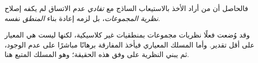 \documentclass[../../../include/open-logic-section]{subfiles}
\begin{document}
  فالحاصل أن من أراد الأخذ بالاستيعاب الساذج مع \emph{تفادي} عدم الاتساق
لم يكفه إصلاح \emph{نظرية المجموعات}، بل لزمه إعادة بناء
\emph{المنطق} نفسه.

وقد وُضعت فعلًا نظريات مجموعات بمنطقيات غير كلاسيكية، لكنها ليست هي
المعيار على أقل تقدير. وأما المسلك المعياري فيأخذ المفارقة برهانًا
مباشرًا على عدم الوجود، ثم يبني النظرية على وفق هذه الحقيقة؛ وهو
المسلك المتبع هنا.
\end{document}
